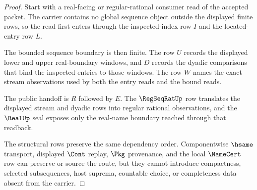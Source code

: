 \begin{proof}
Start with a real-facing or regular-rational consumer read of the accepted packet. The carrier contains no global sequence object outside the displayed finite rows, so the read first enters through the inspected-index row $I$ and the located-entry row $L$.

The bounded sequence boundary is then finite. The row $U$ records the displayed lower and upper real-boundary windows, and $D$ records the dyadic comparisons that bind the inspected entries to those windows. The row $W$ names the exact stream observations used by both the entry reads and the bound reads.

The public handoff is $R$ followed by $E$. The $\RegSeqRatUp$ row translates the displayed stream and dyadic rows into regular rational observations, and the $\RealUp$ seal exposes only the real-name boundary reached through that readback.

The structural rows preserve the same dependency order. Componentwise $\hsame$ transport, displayed $\Cont$ replay, $\Pkg$ provenance, and the local $\NameCert$ row can preserve or source the route, but they cannot introduce compactness, selected subsequences, host suprema, countable choice, or completeness data absent from the carrier.
\end{proof}


\begin{closurestatus}{\LocatedBoundedRealSequenceUp}
  \theoryclosure{\seedClosure}
  \formalstatus{\unformalizedV}
\end{closurestatus}
